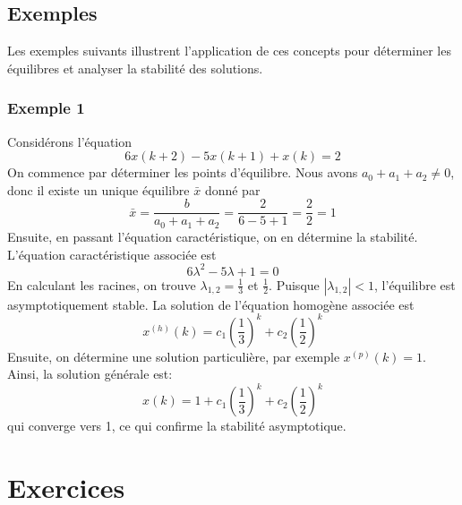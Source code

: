         \subsection{Exemples}
            Les exemples suivants illustrent l'application de ces concepts pour déterminer les équilibres et analyser la stabilité des solutions.
            \subsubsection{Exemple 1}
                Considérons l'équation
                \begin{equation}
                    6x(k+2)-5x(k+1)+x(k) = 2
                \end{equation}
                On commence par déterminer les points d'équilibre. Nous avons $a_0+a_1+a_2 \neq 0$, donc il existe un unique équilibre $\bar{x}$ donné par
                \begin{equation}
                    \bar{x} = \frac{b}{a_0 + a_1 + a_2} = \frac {2}{6 - 5 + 1} = \frac{2}{2} = 1
                \end{equation}
                Ensuite, en passant l'équation caractéristique, on en détermine la stabilité. L'équation caractéristique associée est
                \begin{equation}
                    6\lambda^2-5\lambda+1 = 0
                \end{equation}
                En calculant les racines, on trouve $\lambda_{1,2} = \frac{1}{3}$ et $\frac{1}{2}$. Puisque $|\lambda_{1,2}| < 1$, l'équilibre est asymptotiquement stable.
                La solution de l'équation homogène associée est
                \begin{equation}
                    x^{(h)}(k) = c_1 \left(\frac{1}{3}\right)^k+c_2 \left(\frac{1}{2}\right)^k
                \end{equation}
                Ensuite, on détermine une solution particulière, par exemple $x^{(p)}(k) = 1$. Ainsi, la solution générale est:
                \begin{equation}
                    x(k) = 1+c_1 \left(\frac{1}{3}\right)^k+c_2 \left(\frac{1}{2}\right)^k
                \end{equation}
                qui converge vers 1, ce qui confirme la stabilité asymptotique.
            

    \section{Exercices}
